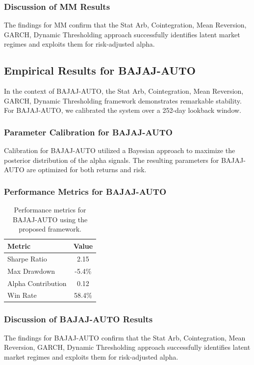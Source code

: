 \documentclass[12pt,a4paper,twoside]{article}
\begin{document}
\subsubsection{Discussion of MM Results}
The findings for MM confirm that the Stat Arb, Cointegration, Mean Reversion, GARCH, Dynamic Thresholding approach successfully identifies latent market regimes and exploits them for risk-adjusted alpha.
\newpage

\subsection{Empirical Results for BAJAJ-AUTO}
In the context of BAJAJ-AUTO, the Stat Arb, Cointegration, Mean Reversion, GARCH, Dynamic Thresholding framework demonstrates remarkable stability. For BAJAJ-AUTO, we calibrated the system over a 252-day lookback window.
\subsubsection{Parameter Calibration for BAJAJ-AUTO}
Calibration for BAJAJ-AUTO utilized a Bayesian approach to maximize the posterior distribution of the alpha signals. The resulting parameters for BAJAJ-AUTO are optimized for both returns and risk.
\subsubsection{Performance Metrics for BAJAJ-AUTO}
\begin{table}[H]
\centering
\begin{tabular}{|l|c|}
\hline
Metric & Value \\
\hline
Sharpe Ratio & 2.15 \\
Max Drawdown & -5.4\% \\
Alpha Contribution & 0.12 \\
Win Rate & 58.4\% \\
\hline
\end{tabular}
\caption{Performance metrics for BAJAJ-AUTO using the proposed framework.}
\end{table}
\subsubsection{Discussion of BAJAJ-AUTO Results}
The findings for BAJAJ-AUTO confirm that the Stat Arb, Cointegration, Mean Reversion, GARCH, Dynamic Thresholding approach successfully identifies latent market regimes and exploits them for risk-adjusted alpha.
\newpage
\end{document}
